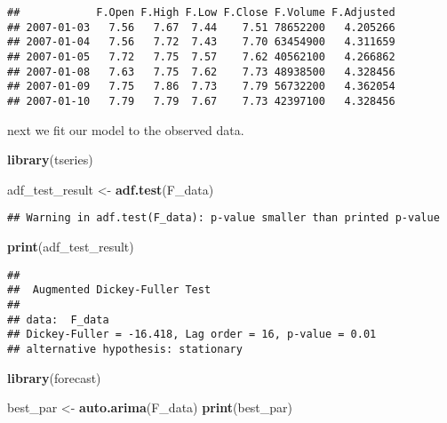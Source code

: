 \documentclass[
]{article}
\newenvironment{Shaded}{\begin{snugshade}}{\end{snugshade}}
\newcommand{\FunctionTok}[1]{\textcolor[rgb]{0.13,0.29,0.53}{\textbf{#1}}}
\newcommand{\NormalTok}[1]{#1}
\newcommand{\OtherTok}[1]{\textcolor[rgb]{0.56,0.35,0.01}{#1}}
\newcommand{\SpecialCharTok}[1]{\textcolor[rgb]{0.81,0.36,0.00}{\textbf{#1}}}
\begin{document}
\begin{verbatim}
##            F.Open F.High F.Low F.Close F.Volume F.Adjusted
## 2007-01-03   7.56   7.67  7.44    7.51 78652200   4.205266
## 2007-01-04   7.56   7.72  7.43    7.70 63454900   4.311659
## 2007-01-05   7.72   7.75  7.57    7.62 40562100   4.266862
## 2007-01-08   7.63   7.75  7.62    7.73 48938500   4.328456
## 2007-01-09   7.75   7.86  7.73    7.79 56732200   4.362054
## 2007-01-10   7.79   7.79  7.67    7.73 42397100   4.328456
\end{verbatim}

\begin{Shaded}
\end{Shaded}

next we fit our model to the observed data.

\begin{Shaded}
\begin{Highlighting}[]
\FunctionTok{library}\NormalTok{(tseries)}

\NormalTok{adf\_test\_result }\OtherTok{\textless{}{-}} \FunctionTok{adf.test}\NormalTok{(F\_data)}
\end{Highlighting}
\end{Shaded}

\begin{verbatim}
## Warning in adf.test(F_data): p-value smaller than printed p-value
\end{verbatim}

\begin{Shaded}
\begin{Highlighting}[]
\FunctionTok{print}\NormalTok{(adf\_test\_result)}
\end{Highlighting}
\end{Shaded}

\begin{verbatim}
## 
##  Augmented Dickey-Fuller Test
## 
## data:  F_data
## Dickey-Fuller = -16.418, Lag order = 16, p-value = 0.01
## alternative hypothesis: stationary
\end{verbatim}

\begin{Shaded}
\begin{Highlighting}[]
\FunctionTok{library}\NormalTok{(forecast)}

\NormalTok{best\_par }\OtherTok{\textless{}{-}} \FunctionTok{auto.arima}\NormalTok{(F\_data)}
\FunctionTok{print}\NormalTok{(best\_par)}
\end{Highlighting}
\end{Shaded}
\end{document}
